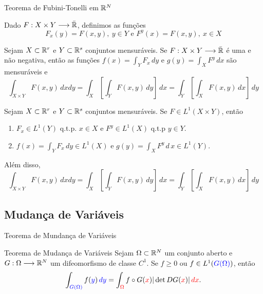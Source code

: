 \begin{frame}{Teorema de Fubini-Tonelli em \(\mathbb{R}^N\)}

	
	Dado $F:X\times Y\longrightarrow \bar{\mathbb{R}}$, definimos as funções
	\[F_x(y)=F(x,y), \ y\in Y \text{ e } F^y(x)=F(x,y),\ x\in X\]
		\begin{teo}[Tonelli]
		Sejam $X\subset \mathbb{R}^r$ e $Y\subset \mathbb{R}^s$ conjuntos mensuráveis.	Se $F:X\times Y\longrightarrow \bar{\mathbb{R}}$ é uma  e {\color{red}não negativa}, então as funções $f(x)=\int_{Y}F_x\,dy$ e $g(y)=\int_{X}F^y\,dx$ são mensuráveis e 
		\begin{equation*}
			\int_{X\times Y}F(x,y) \, dxdy=\int_{X}\left[\int_Y F(x,y)\,dy \right] \,dx=\int_{Y}\left[\int_X F(x,y)\,dx \right] \,dy		
		\end{equation*}
	\end{teo}

\end{frame}

\begin{frame}
%	
\begin{teo}[Fubini]
Sejam $X\subset \mathbb{R}^r$ e $Y\subset \mathbb{R}^s$ conjuntos mensuráveis. Se {\color{red}$F\in L^1(X\times Y)$}, então 
\begin{enumerate}
\item $F_x\in L^1(Y)$ q.t.p.  $x\in X$ e $F^y\in L^1(X)$ q.t.p  $y\in Y$.
\item $f(x)=\int_{Y}F_x\,dy\in L^1(X)$ e $g(y)=\int_{X}F^y\,d\,x\in L^1(Y)$.
			\end{enumerate}	
		Além disso, 
		\begin{equation*}
			\int_{X\times Y}F(x,y) \, dxdy=\int_{X}\left[\int_Y F(x,y)\,dy \right] \,dx=\int_{Y}\left[\int_X F(x,y)\,dx \right] \,dy		
		\end{equation*}
\end{teo}
\end{frame}

\subsection*{Mudança de Variáveis}
\begin{frame}{Teorema de Mundança de Variáveis}
%	
\begin{block}{Teorema de Mudança de Variáveis}
Sejam \(\Omega\subset \mathbb{R}^N\) um conjunto aberto e {\color{blue}\(G:\Omega \longrightarrow \mathbb{R}^N\)} um {\color{blue}difeomorfismo de classe \(C^1\)}. Se {\color{blue}\(f\geq 0\)} ou \(f\in L^1({\color{blue}G(\Omega)})\), então
\[
\int_{{\color{blue}G(\Omega)}}f({\color{blue}y})\,{\color{blue}dy}=\int_{\color{red}\Omega} f\circ G({\color{red}x})|\det DG({\color{red}x})|\,{\color{red}dx}.
\]

\end{block}
\end{frame}

